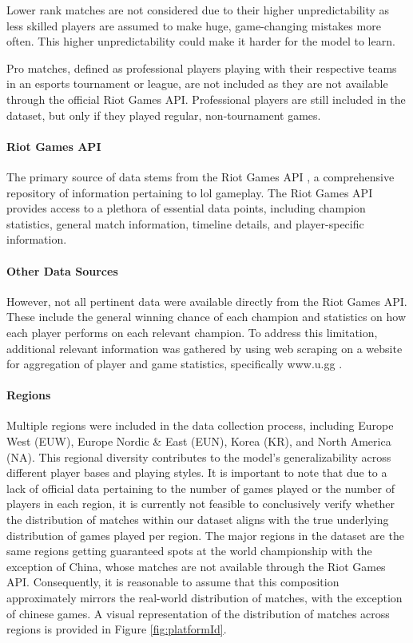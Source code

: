 \documentclass[12pt, a4paper, headinclude, twoside, plainheadsepline, open=right, numbers=noenddot, hidelinks, toc=listof, toc=bibliography]{scrreprt}
\begin{document}
Lower rank matches are not considered due to their higher unpredictability as less skilled players are assumed to make huge, game-changing mistakes more often.
This higher unpredictability could make it harder for the model to learn.

Pro matches, defined as professional players playing with their respective teams in an esports tournament or league, are not included as they are not available through the official Riot Games API.
Professional players are still included in the dataset, but only if they played regular, non-tournament games.

\paragraph{Riot Games API}
The primary source of data stems from the Riot Games API \cite{RiotDeveloperPortal}, a comprehensive repository of information pertaining to \ac{lol} gameplay.
The Riot Games API provides access to a plethora of essential data points, including champion statistics, general match information, timeline details, and player-specific information.

\paragraph{Other Data Sources}
However, not all pertinent data were available directly from the Riot Games API.
These include the general winning chance of each champion and statistics on how each player performs on each relevant champion.
To address this limitation, additional relevant information was gathered by using web scraping on a website for aggregation of player and game statistics, specifically www.u.gg \cite{GGBestLeague}.
\paragraph{Regions}
Multiple regions were included in the data collection process, including Europe West (EUW), Europe Nordic \& East (EUN), Korea (KR), and North America (NA).
This regional diversity contributes to the model's generalizability across different player bases and playing styles.
It is important to note that due to a lack of official data pertaining to the number of games played or the number of players in each region, it is currently not feasible to conclusively verify whether the distribution of matches within our dataset aligns with the true underlying distribution of games played per region.
The major regions in the dataset are the same regions getting guaranteed spots at the world championship \cite{2023LeagueLegends2023} with the exception of China, whose matches are not available through the Riot Games API.
Consequently, it is reasonable to assume that this composition approximately mirrors the real-world distribution of matches, with the exception of chinese games.
A visual representation of the distribution of matches across regions is provided in Figure \ref{fig:platformId}.
\end{document}
